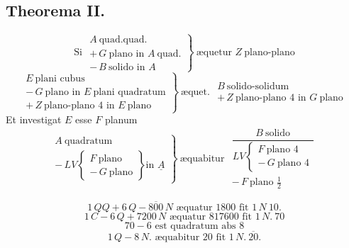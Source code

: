 \documentclass[11pt,a4paper]{article}
\begin{document}
\subsection*{Theorema II.}

\[ \text{Si } \left.\begin{array}{l} A\ \text{quad.quad.} \\ +\,G\ \text{plano in } A\ \text{quad.} \\ -\,B\ \text{solido in } A \end{array}\right\}\ \text{æquetur } Z\ \text{plano-plano} \]
\[ \left.\begin{array}{l} E\ \text{plani cubus} \\ -\,G\ \text{plano in } E\ \text{plani quadratum} \\ +\,Z\ \text{plano-plano } 4 \text{ in } E\ \text{plano} \end{array}\right\}\ \text{æquet. } \begin{array}{l} B\ \text{solido-solidum} \\ +\,Z\ \text{plano-plano } 4 \text{ in } G\ \text{plano} \end{array} \]
Et investigat $E$ esse $F$ planum
\[ \left.\begin{array}{l} A\ \text{quadratum} \\ -\,LV \left\{\begin{array}{l} F\ \text{plano} \\ -\,G\ \text{plano} \end{array}\right\} \text{in } \underline{A} \end{array}\right\}\ \text{æquabitur } \begin{array}{l} \dfrac{B\ \text{solido}}{LV \left\{\begin{array}{l} F\ \text{plano } 4 \\ -\,G\ \text{plano } 4 \end{array}\right.} \\ -\,F\ \text{plano } \frac{1}{2} \end{array} \]

\[ 1\,QQ + 6\,Q - \overline{800}\,N \text{ æquatur } 1800 \text{ fit } 1\,N\ 10. \]
\[ 1\,C - 6\,Q + 7200\,N \text{ æquatur } 817600 \text{ fit } 1\,N.\ 70 \]
\[ 70 - 6 \text{ est quadratum abs } 8 \]
\[ 1\,Q - 8\,N. \text{ æquabitur } 20 \text{ fit } 1\,N.\ \overline{20}. \]
\end{document}
